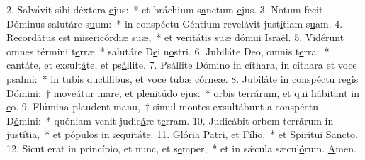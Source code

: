2. Salvávit sibi déxtera \uline{e}jus:~* et bráchium s\uline{a}nctum \uline{e}jus.
3. Notum fecit Dóminus salutáre s\uline{u}um:~* in conspéctu Géntium revelávit just\uline{í}tiam s\uline{u}am.
4. Recordátus est misericórdiæ s\uline{u}æ,~* et veritátis suæ d\uline{ó}mui \uline{I}sraël.
5. Vidérunt omnes términi t\uline{e}rræ~* salutáre D\uline{e}i n\uline{o}stri.
6. Jubiláte Deo, omnis t\uline{e}rra:~* cantáte, et exsult\uline{á}te, et ps\uline{á}llite.
7. Psállite Dómino in cíthara, in cíthara et voce ps\uline{a}lmi:~* in tubis ductílibus, et voce t\uline{u}bæ c\uline{ó}rneæ.
8. Jubiláte in conspéctu regis Dómini:~† moveátur mare, et plenitúdo \uline{e}jus:~* orbis terrárum, et qui hábit\uline{a}nt in \uline{e}o.
9. Flúmina plaudent manu,~† simul montes exsultábunt a conspéctu D\uline{ó}mini:~* quóniam venit judic\uline{á}re t\uline{e}rram.
10. Judicábit orbem terrárum in just\uline{í}tia,~* et pópulos in \uline{æ}quit\uline{á}te.
11. Glória Patri, et F\uline{í}lio,~* et Spir\uline{í}tui S\uline{a}ncto.
12. Sicut erat in princípio, et nunc, et s\uline{e}mper,~* et in sǽcula sæcul\uline{ó}rum. \uline{A}men.
